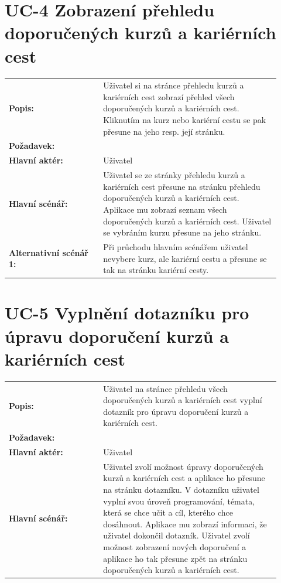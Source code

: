 \section{UC-4 Zobrazení přehledu doporučených kurzů a kariérních cest}\label{sec:uc-4}

\begin{tabular}{p{0.32\linewidth}p{0.6\linewidth}}
  \textbf{Popis:} & Uživatel si na stránce přehledu kurzů a kariérních cest zobrazí přehled všech doporučených kurzů a kariérních cest. Kliknutím na kurz nebo kariérní cestu se pak přesune na jeho resp. její stránku. \\
  \textbf{Požadavek:} & \nameref{sec:fp-course-browse} \\
  \textbf{Hlavní aktér:} & Uživatel \\
  \textbf{Hlavní scénář:} & Uživatel se ze stránky přehledu kurzů a kariérních cest přesune na stránku přehledu doporučených kurzů a kariérních cest. Aplikace mu zobrazí seznam všech doporučených kurzů a kariérních cest. Uživatel se vybráním kurzu přesune na jeho stránku. \\
  \textbf{Alternativní scénář 1:} & Při průchodu hlavním scénářem uživatel nevybere kurz, ale kariérní cestu a přesune se tak na stránku kariérní cesty. \\
\end{tabular}

\section{UC-5 Vyplnění dotazníku pro úpravu doporučení kurzů a kariérních cest}\label{sec:uc-5}

\begin{tabular}{p{0.32\linewidth}p{0.6\linewidth}}
  \textbf{Popis:} & Uživatel na stránce přehledu všech doporučených kurzů a kariérních cest vyplní dotazník pro úpravu doporučení kurzů a kariérních cest. \\
  \textbf{Požadavek:} & \nameref{sec:fp-course-browse} \\
  \textbf{Hlavní aktér:} & Uživatel \\
  \textbf{Hlavní scénář:} & Uživatel zvolí možnost úpravy doporučených kurzů a kariérních cest a aplikace ho přesune na stránku dotazníku. V dotazníku uživatel vyplní svou úroveň programování, témata, která se chce učit a cíl, kterého chce dosáhnout. Aplikace mu zobrazí informaci, že uživatel dokončil dotazník. Uživatel zvolí možnost zobrazení nových doporučení a aplikace ho tak přesune zpět na stránku doporučených kurzů a kariérních cest. \\
\end{tabular}


